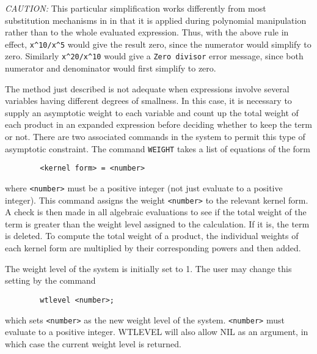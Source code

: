{\it CAUTION:}  This particular simplification works differently from most
substitution mechanisms in {\REDUCE} in that it is applied during
polynomial manipulation rather than to the whole evaluated expression.
Thus, with the above rule in effect, {\tt x\verb|^|10/x\verb|^|5} would give the
result zero, since the numerator would simplify to zero.  Similarly
{\tt x\verb|^|20/x\verb|^|10} would give a {\tt Zero divisor} error message,
since both numerator and denominator would first simplify to zero.

The method just described is not adequate when expressions involve several
variables having different degrees of smallness. In this case, it is
necessary to supply an asymptotic weight to each variable and count up the
total weight of each product in an expanded expression before deciding
whether to keep the term or not. There are two associated commands in the
system to permit this type of asymptotic constraint. The command {\tt WEIGHT}
takes a list of equations of the form
\begin{verbatim}
        <kernel form> = <number>
\end{verbatim}
where {\tt <number>} must be a positive integer (not just evaluate to a
positive integer).  This command assigns the weight {\tt <number>} to the
relevant kernel form.  A check is then made in all algebraic evaluations
to see if the total weight of the term is greater than the weight level
assigned to the calculation.  If it is, the term is deleted.  To compute
the total weight of a product, the individual weights of each kernel form
are multiplied by their corresponding powers and then added.

The weight level of the system is initially set to 1. The user may change
this setting by the command
\begin{verbatim}
        wtlevel <number>;
\end{verbatim}
which sets {\tt <number>} as the new weight level of the system.
{\tt <number>} must evaluate to a positive integer.  WTLEVEL will also
allow NIL as an argument, in which case the current weight level is returned.
